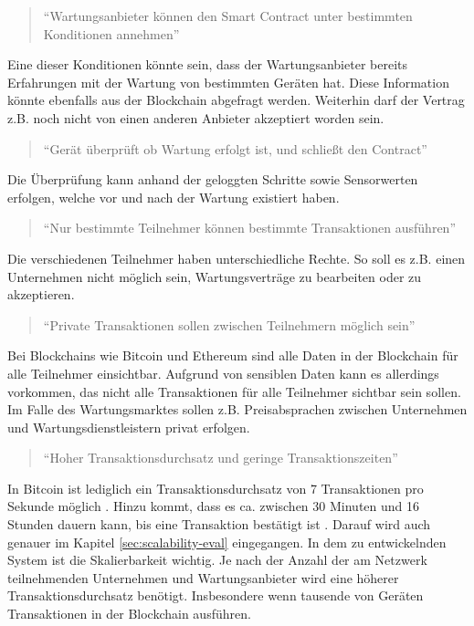 \begin{quote}
    ``Wartungsanbieter können den Smart Contract unter bestimmten Konditionen annehmen''
\end{quote}

Eine dieser Konditionen könnte sein, dass der Wartungsanbieter bereits Erfahrungen mit der Wartung von bestimmten Geräten hat. Diese Information könnte ebenfalls aus der Blockchain abgefragt werden. Weiterhin darf der Vertrag z.B. noch nicht von einen anderen Anbieter akzeptiert worden sein. 

\begin{quote}
    ``Gerät überprüft ob Wartung erfolgt ist, und schließt den Contract''
\end{quote}

Die Überprüfung kann anhand der geloggten Schritte sowie Sensorwerten erfolgen, welche vor und nach der Wartung existiert haben.

\begin{quote}
    ``Nur bestimmte Teilnehmer können bestimmte Transaktionen ausführen''
\end{quote}

Die verschiedenen Teilnehmer haben unterschiedliche Rechte. So soll es z.B. einen Unternehmen nicht möglich sein, Wartungsverträge zu bearbeiten oder zu akzeptieren.

\begin{quote}
    ``Private Transaktionen sollen zwischen Teilnehmern möglich sein''
\end{quote}

Bei Blockchains wie Bitcoin und Ethereum sind alle Daten in der Blockchain für alle Teilnehmer einsichtbar. Aufgrund von sensiblen Daten kann es allerdings vorkommen, das nicht alle Transaktionen für alle Teilnehmer sichtbar sein sollen. Im Falle des Wartungsmarktes sollen z.B. Preisabsprachen zwischen Unternehmen und Wartungsdienstleistern privat erfolgen.

\begin{quote}
    ``Hoher Transaktionsdurchsatz und geringe Transaktionszeiten''
\end{quote}

In Bitcoin ist lediglich ein Transaktionsdurchsatz von 7 Transaktionen pro Sekunde möglich \cite{ZhengBlockchainChallengesOpportunities2017}. Hinzu kommt, dass es ca. zwischen 30 Minuten und 16 Stunden dauern kann, bis eine Transaktion bestätigt ist \cite{BuchkoHowLongBitcoin2017}. Darauf wird auch genauer im Kapitel \ref{sec:scalability-eval} eingegangen. In dem zu entwickelnden System ist die Skalierbarkeit wichtig. Je nach der Anzahl der am Netzwerk teilnehmenden Unternehmen und Wartungsanbieter wird eine höherer Transaktionsdurchsatz benötigt. Insbesondere wenn tausende von Geräten Transaktionen in der Blockchain ausführen.

